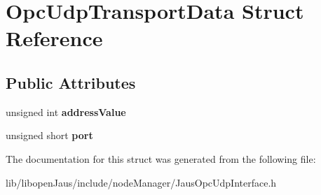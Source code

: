 \hypertarget{struct_opc_udp_transport_data}{\section{\-Opc\-Udp\-Transport\-Data \-Struct \-Reference}
\label{struct_opc_udp_transport_data}
}
\subsection*{\-Public \-Attributes}
\begin{DoxyCompactItemize}
\item 
\hypertarget{struct_opc_udp_transport_data_add2a62ad569e099586accc8d3ec431a3}{unsigned int {\bfseries address\-Value}}\label{struct_opc_udp_transport_data_add2a62ad569e099586accc8d3ec431a3}

\item 
\hypertarget{struct_opc_udp_transport_data_a3ed7c9aa6c3c7b301fbc69e54bd8f00f}{unsigned short {\bfseries port}}\label{struct_opc_udp_transport_data_a3ed7c9aa6c3c7b301fbc69e54bd8f00f}

\end{DoxyCompactItemize}


\-The documentation for this struct was generated from the following file\-:\begin{DoxyCompactItemize}
\item 
lib/libopen\-Jaus/include/node\-Manager/\-Jaus\-Opc\-Udp\-Interface.\-h\end{DoxyCompactItemize}
